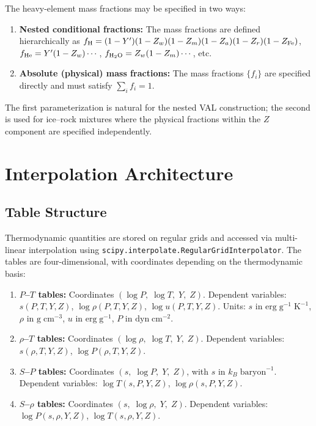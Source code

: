 \documentclass[twocolumn]{aastex701}
\begin{document}
The heavy-element mass fractions may be specified in two ways:
\begin{enumerate}
    \item \textbf{Nested conditional fractions:} The mass fractions are defined hierarchically as $f_{\rm H} = (1-Y')(1-Z_w)(1-Z_m)(1-Z_a)(1-Z_r)(1-Z_{\rm Fe})$, $f_{\rm He} = Y'(1-Z_w)\cdots$, $f_{\rm H_2O} = Z_w(1-Z_m)\cdots$, etc.
    \item \textbf{Absolute (physical) mass fractions:} The mass fractions $\{f_i\}$ are specified directly and must satisfy $\sum_i f_i = 1$.
\end{enumerate}
The first parameterization is natural for the nested VAL construction; the second is used for ice--rock mixtures where the physical fractions within the $Z$ component are specified independently.

\section{Interpolation Architecture}\label{sec:interp}

\subsection{Table Structure}

Thermodynamic quantities are stored on regular grids and accessed via multi-linear interpolation using \texttt{scipy.interpolate.RegularGridInterpolator}.
The tables are four-dimensional, with coordinates depending on the thermodynamic basis:

\begin{enumerate}
    \item \textbf{$P$--$T$ tables:} Coordinates $(\log P,\;\log T,\;Y,\;Z)$.
    Dependent variables: $s(P,T,Y,Z)$, $\log\rho(P,T,Y,Z)$, $\log u(P,T,Y,Z)$.
    Units: $s$ in $\mathrm{erg\;g^{-1}\;K^{-1}}$, $\rho$ in $\mathrm{g\;cm^{-3}}$, $u$ in $\mathrm{erg\;g^{-1}}$, $P$ in $\mathrm{dyn\;cm^{-2}}$.

    \item \textbf{$\rho$--$T$ tables:} Coordinates $(\log\rho,\;\log T,\;Y,\;Z)$.
    Dependent variables: $s(\rho,T,Y,Z)$, $\log P(\rho,T,Y,Z)$.

    \item \textbf{$S$--$P$ tables:} Coordinates $(s,\;\log P,\;Y,\;Z)$, with $s$ in $k_B\;\mathrm{baryon}^{-1}$.
    Dependent variables: $\log T(s,P,Y,Z)$, $\log\rho(s,P,Y,Z)$.

    \item \textbf{$S$--$\rho$ tables:} Coordinates $(s,\;\log\rho,\;Y,\;Z)$.
    Dependent variables: $\log P(s,\rho,Y,Z)$, $\log T(s,\rho,Y,Z)$.
\end{enumerate}
\end{document}
